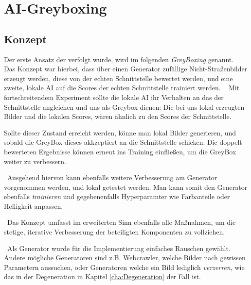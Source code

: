 \chapter{AI-Greyboxing}
\label{Cha:GreyBoxing}
\section{Konzept}
Der erste Ansatz der verfolgt wurde, wird im folgenden \textit{GreyBoxing} genannt. 
~\newline 
Das Konzept war hierbei, dass über einen Generator zufällige Nicht-Straßenbilder erzeugt werden, diese von der echten Schnittstelle bewertet werden, und eine zweite, lokale AI auf die Scores der echten Schnittstelle trainiert werden. 
~\newline
Mit fortschreitendem Experiment sollte die lokale AI ihr Verhalten an das der Schnittstelle angleichen und uns als Greybox dienen: Die bei uns lokal erzeugten Bilder und die lokalen Scores, wären ähnlich zu den Scores der Schnittstelle. 

Sollte dieser Zustand erreicht werden, könne man lokal Bilder generieren, und sobald die GreyBox dieses akkzeptiert an die Schnittstelle schicken. Die doppelt-bewerteten Ergebnisse können erneut ins Training einfließen, um die GreyBox weiter zu verbessern. 

~\newline Ausgehend hiervon kann ebenfalls weitere Verbesserung am Generator vorgenommen werden, und lokal getestet werden. Man kann somit den Generator ebenfalls \textit{trainieren} und gegebenenfalls Hyperparamter wie Farbanteile oder Helligkeit anpassen. 

~\newline Das Konzept umfasst im erweiterten Sinn ebenfalls alle Maßnahmen, um die stetige, iterative Verbesserung der beteiligten Komponenten zu vollziehen.      

~\newline Als Generator wurde für die Implementierung einfaches Rauschen gewählt. Andere mögliche Generatoren sind z.B. Webcrawler, welche Bilder nach gewissen Parametern aussuchen, oder Generatoren welche ein Bild lediglich \textit{verzerren}, wie das in der Degeneration in Kapitel \ref{cha:Degeneration} der Fall ist. 

